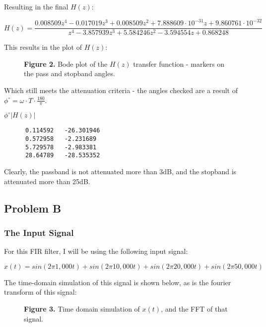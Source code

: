 \documentclass[11pt]{article}
\begin{document}
Resulting in the final \(H(z)\):

\[H(z)=\frac{0.008509z^4-0.017019z^3+0.008509z^2+7.888609\cdot 10^{-31}z+9.860761\cdot 10^{-32}}{z^4-3.857939z^3+5.584246z^2-3.594554z+0.868248}\]

This results in the plot of $H(z)$:

\begin{figure}[H]
\begin{center}
\caption{\textbf{Figure 2.} Bode plot of the $H(z)$ transfer function - markers on the pass and stopband angles.}
\end{center}
\end{figure}

Which still meets the attenuation criteria - the angles checked are a result of $\phi ^{\circ}=\omega \cdot T\cdot \frac{180}{\pi}$.

\hspace{1.25cm}$\phi ^{\circ}$\hspace{1.50cm}$|H(z)|$
    \begin{verbatim}
      0.114592   -26.301946
      0.572958   -2.231689
      5.729578   -2.983381
      28.64789   -28.535352
    \end{verbatim}
    
Clearly, the passband is not attenuated more than 3dB, and the stopband is attenuated more than 25dB.

\subsection{Problem B}
\subsubsection{The Input Signal}
For this FIR filter, I will be using the following input signal:

$$x(t)=sin(2\pi 1,000t)+sin(2\pi 10,000t)+sin(2\pi 20,000t)+sin(2\pi 50,000t)$$

The time-domain simulation of this signal is shown below, as is the fourier transform of this signal:

\begin{figure}[H]
\begin{center}
\caption{\textbf{Figure 3.} Time domain simulation of $x(t)$, and the FFT of that signal.}
\end{center}
\end{figure}
\end{document}
